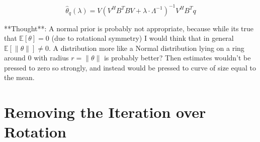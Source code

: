 $$ \hat\theta_q(\lambda) = V ( V^H B^T B V + \lambda \cdot \Lambda^{-1})^{-1} V^H B^T q$$

**Thought**: A normal prior is probably not appropriate, because while its true that $\mathbb{E}[\theta] = 0$ (due to rotational symmetry) I would think that in general $\mathbb{E}[\lVert\theta\rVert] \neq 0$. A distribution more like a Normal distribution lying on a ring around 0 with radius $r = \lVert\theta\rVert$ is probably better? Then estimates wouldn't be pressed to zero so strongly, and instead would be pressed to curve of size equal to the mean.


\section{Removing the Iteration over Rotation}
\label{app:a-warping}


